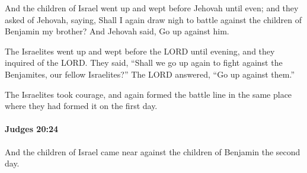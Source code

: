 			\begin{versebox}
					\item[BHS] 
					\item[ASV] And the children of Israel went up and wept before Jehovah until even; and they asked of Jehovah, saying, Shall I again draw nigh to battle against the children of Benjamin my brother? And Jehovah said, Go up against him.
					\item[NIV] The Israelites went up and wept before the LORD until evening, and they inquired of the LORD. They said, “Shall we go up again to fight against the Benjamites, our fellow Israelites?” The LORD answered, “Go up against them.”
					\item[NRSV] The Israelites took courage, and again formed the battle line in the same place where they had formed it on the first day.
			\end{versebox}

		\paragraph{Judges 20:24} %
			\label{JUDGES-20-24}

			And the children of Israel came near against the children of Benjamin the second day.

